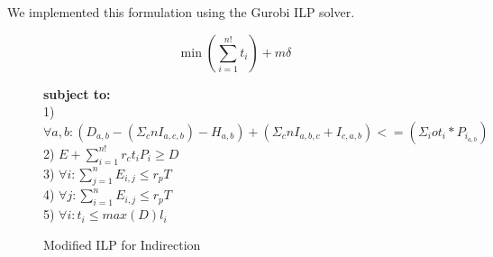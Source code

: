 We implemented this formulation using the Gurobi ILP solver.


\begin{figure}[t]
\small
\centering
\begin{mdframed}
\[
\min \left(\sum_{i=1}^{n!} t_i\right) + m\delta
\]
\begin{tabbing}
\textbf{subject to:}\\[4pt]
1)  $\forall a, b: (D_{a,b} - (\Sigma_{c}{n} I_{a,c,b}) - H_{a,b})
    + (\Sigma_{c}{n} I_{a,b,c} + I_{c,a,b})
    <= (\Sigma_{i}{o} t_i * P_{i_{a,b}})$ \\[4pt]
2) $E + \sum_{i=1}^{n!} r_c t_i P_i \geq D$\\[4pt]
3) $\forall i: \sum_{j=1}^{n} E_{i,j} \leq r_p T$\\[4pt]
4) $\forall j: \sum_{i=1}^{n} E_{i,j} \leq r_p T$\\[4pt]
5) $\forall i: t_i \leq \textit{max}(D) l_i$
\end{tabbing}
\end{mdframed}
\caption{Modified ILP for Indirection}
\label{fig:hybrid-indirection}
\end{figure}

